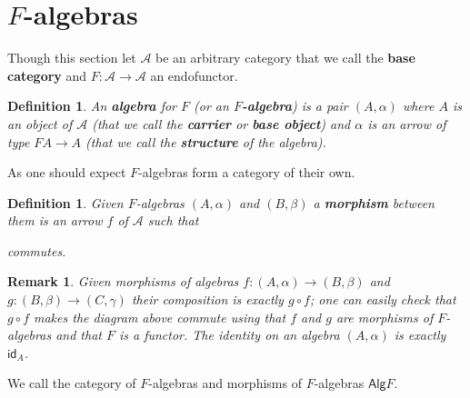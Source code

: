 \documentclass[letterpaper, 11pt, oneside]{memoir}
\theoremstyle{myteo}
\newtheorem{definition}[theorem]{Definition}
\newtheorem{remark}[theorem]{Remark}
\numberwithin{equation}{section}
\newcommand{\marginnote}[1]{\marginpar{\footnotesize #1}}
\newcommand{\id}{\textsf{id}}
\newcommand{\alg}{\textsf{Alg}}
\begin{document}
\section{\(F\)-algebras}

Though this section let \(\mathscr{A}\) be an arbitrary category that we call the \textbf{base category} and \(F \colon \mathscr{A} \to \mathscr{A}\) an endofunctor.

\begin{definition}
  An \textbf{algebra} for \(F\) (or an \textbf{\(F\)-algebra}) is a pair \((A, \alpha)\) where \(A\) is an object of \(\mathscr{A}\) (that we call the \textbf{carrier} or \textbf{base object}) \marginnote{\(F\)-algebra} and \(\alpha\) is an arrow of type \(FA \to A\) (that we call the \textbf{structure} of the algebra).
\end{definition}

As one should expect \(F\)-algebras form a category of their own.

\begin{definition}
  Given \(F\)-algebras \((A, \alpha)\) and \((B, \beta)\) a \textbf{morphism} between them is an arrow \(f\) of \(\mathscr{A}\) such that
  \begin{center}
  \end{center}
  commutes.
\end{definition}

\begin{remark}
  Given morphisms of algebras \(f \colon (A, \alpha) \to (B, \beta)\) and \(g \colon (B, \beta) \to (C, \gamma)\) their composition is exactly \(g \circ f\); one can easily check that \(g \circ f\) makes the diagram above commute using that \(f\) and \(g\) are morphisms of \(F\)-algebras and that \(F\) is a functor.
  The identity on an algebra \((A, \alpha)\) is exactly \(\id_A\).
\end{remark}

We call the category of \(F\)-algebras and morphisms of \(F\)-algebras \(\alg F\).
\marginnote{\(\alg F\)}
\end{document}
